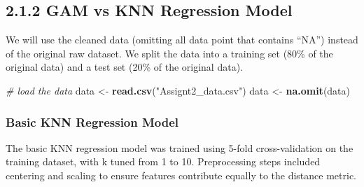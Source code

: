 \documentclass[
]{article}
\newenvironment{Shaded}{\begin{snugshade}}{\end{snugshade}}
\newcommand{\AttributeTok}[1]{\textcolor[rgb]{0.13,0.29,0.53}{#1}}
\newcommand{\CommentTok}[1]{\textcolor[rgb]{0.56,0.35,0.01}{\textit{#1}}}
\newcommand{\ConstantTok}[1]{\textcolor[rgb]{0.56,0.35,0.01}{#1}}
\newcommand{\DecValTok}[1]{\textcolor[rgb]{0.00,0.00,0.81}{#1}}
\newcommand{\FloatTok}[1]{\textcolor[rgb]{0.00,0.00,0.81}{#1}}
\newcommand{\FunctionTok}[1]{\textcolor[rgb]{0.13,0.29,0.53}{\textbf{#1}}}
\newcommand{\NormalTok}[1]{#1}
\newcommand{\OtherTok}[1]{\textcolor[rgb]{0.56,0.35,0.01}{#1}}
\newcommand{\SpecialCharTok}[1]{\textcolor[rgb]{0.81,0.36,0.00}{\textbf{#1}}}
\newcommand{\StringTok}[1]{\textcolor[rgb]{0.31,0.60,0.02}{#1}}
\begin{document}
\subsection{2.1.2 GAM vs KNN Regression
Model}\label{gam-vs-knn-regression-model}

We will use the cleaned data (omitting all data point that contains
``NA'') instead of the original raw dataset. We split the data into a
training set (80\% of the original data) and a test set (20\% of the
original data).

\begin{Shaded}
\begin{Highlighting}[]
\CommentTok{\# load the data }
\NormalTok{data }\OtherTok{\textless{}{-}} \FunctionTok{read.csv}\NormalTok{(}\StringTok{"Assignt2\_data.csv"}\NormalTok{)}
\NormalTok{data }\OtherTok{\textless{}{-}} \FunctionTok{na.omit}\NormalTok{(data)}
\end{Highlighting}
\end{Shaded}

\begin{Shaded}
\end{Shaded}

\subsubsection{Basic KNN Regression
Model}\label{basic-knn-regression-model}

The basic KNN regression model was trained using 5-fold cross-validation
on the training dataset, with k tuned from 1 to 10. Preprocessing steps
included centering and scaling to ensure features contribute equally to
the distance metric.
\end{document}
